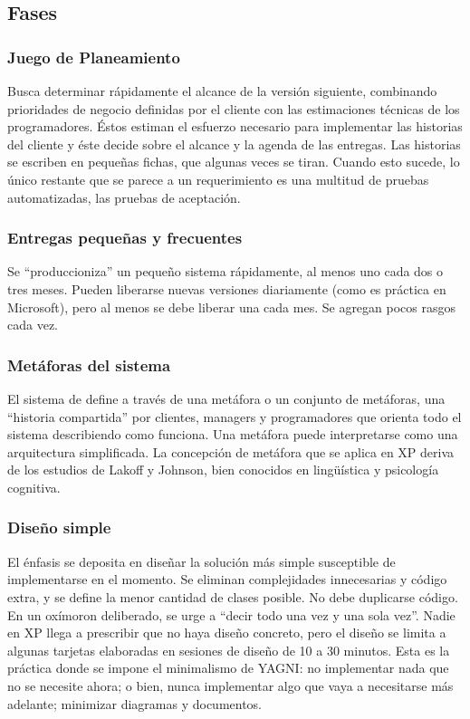 \documentclass{article}
\begin{document}
\subsection{Fases}
\subsubsection{Juego de Planeamiento}
Busca determinar rápidamente el alcance de la versión
siguiente, combinando prioridades de negocio definidas por el cliente con las
estimaciones técnicas de los programadores. Éstos estiman el esfuerzo necesario para
implementar las historias del cliente y éste decide sobre el alcance y la agenda de las
entregas. Las historias se escriben en pequeñas fichas, que algunas veces se tiran.
Cuando esto sucede, lo único restante que se parece a un requerimiento es una
multitud de pruebas automatizadas, las pruebas de aceptación.
\subsubsection{Entregas pequeñas y frecuentes}
Se ``produccioniza'' un pequeño sistema
rápidamente, al menos uno cada dos o tres meses. 
Pueden liberarse nuevas versiones
diariamente (como es práctica en Microsoft), 
pero al menos se debe liberar una cada
mes. Se agregan pocos rasgos cada vez.

\subsubsection{Metáforas del sistema}
El sistema de define a través de una metáfora o un conjunto
de metáforas, una ``historia compartida'' por clientes, managers y programadores que
orienta todo el sistema describiendo como funciona. Una metáfora puede interpretarse
como una arquitectura simplificada. La concepción de metáfora que se aplica en XP
deriva de los estudios de Lakoff y Johnson, bien conocidos en lingüística y psicología
cognitiva.

\subsubsection{Diseño simple}
El énfasis se deposita en diseñar la solución más simple susceptible
de implementarse en el momento. Se eliminan complejidades innecesarias y código
extra, y se define la menor cantidad de clases posible. No debe duplicarse código. En
un oxímoron deliberado, se urge a “decir todo una vez y una sola vez”. Nadie en XP
llega a prescribir que no haya diseño concreto, pero el diseño se limita a algunas
tarjetas elaboradas en sesiones de diseño de 10 a 30 minutos. Esta es la práctica donde
se impone el minimalismo de YAGNI: no implementar nada que no se necesite ahora;
o bien, nunca implementar algo que vaya a necesitarse más adelante; minimizar
diagramas y documentos.
\end{document}
